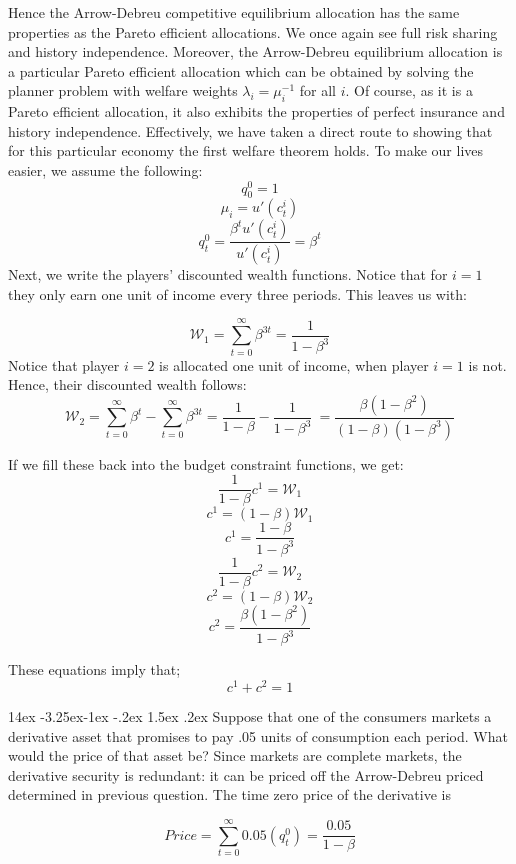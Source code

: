 \documentclass[10pt]{article}
\makeatletter
\newcommand{\bb}{\bigbreak\noindent}
\renewcommand\subsubsection{\leftskip 14ex\@startsection{subsubsection}{3}{\z@}%
	{-3.25ex\@plus -1ex \@minus -.2ex}%
	{1.5ex \@plus .2ex}%
	{\normalfont\large\bfseries}}
\makeatother
\begin{document}
\begin{spacing}{1.5}
		Hence the Arrow-Debreu competitive equilibrium allocation has the same properties as
		the Pareto efficient allocations. We once again see full risk sharing and history independence. Moreover, the Arrow-Debreu equilibrium allocation is a particular Pareto efficient allocation which can be obtained by solving the planner problem with welfare weights $\lambda_i = \mu^{-1}_i$ for all $i$. Of course, as it is a Pareto efficient allocation, it also exhibits the properties of perfect insurance and history independence. Effectively, we have taken a direct route to showing that for this particular economy the first welfare theorem holds.
		\bb
		To make our lives easier, we assume the following:
		\[ q^0_0 = 1 \]
		\[ \mu_i = u'(c^i_t) \]
		\[ q^0_t =  \dfrac{\beta^t u'(c^i_t)}{u'(c^i_t)} = \beta^t \]
		\bb
		Next, we write the players' discounted wealth functions. Notice that for $i = 1$ they only earn one unit of income every three periods. This leaves us with: 
		
		\[ \mathcal{W}_1 = \sum_{t=0}^{\infty} \beta^{3t} = \frac{1}{1-\beta^3}\]
		\bb
		Notice that player $i = 2$ is allocated one unit of income, when player $i = 1$ is not. Hence, their discounted wealth follows: 
		\[ \mathcal{W}_2 = \sum_{t=0}^{\infty} \beta^{t} - \sum_{t=0}^{\infty} \beta^{3t} = \frac{1}{1-\beta}-\frac{1}{1-\beta^3}\ = \dfrac{\beta (1-\beta^2)}{(1-\beta)(1-\beta^3)} \]
		
		\bb
		If we fill these back into the budget constraint functions, we get: 
		\[ \dfrac{1}{1-\beta}c^1 = \mathcal{W}_1 \]
		\[ c^1 = (1-\beta)\mathcal{W}_1 \]
		\[ c^1 = \dfrac{1-\beta}{1-\beta^3} \]
		\bb\bb
		\[ \dfrac{1}{1-\beta}c^2 = \mathcal{W}_2 \]
		\[ c^2 = (1-\beta)\mathcal{W}_2 \]
		\[ c^2 = \dfrac{\beta(1-\beta^2)}{1-\beta^3} \]
		
		These equations imply that;
		\[ c^1 + c^2 = 1 \] 
		
		\subsubsection{Suppose that one of the consumers markets a derivative asset that promises to pay .05 units of consumption each period. What would the price of that asset be?}
		Since markets are complete markets, the derivative security is redundant: it can be priced off the Arrow-Debreu priced determined in previous question. The time zero price of the derivative is 
		
		\[ Price = \sum_{t=0}^{\infty}0.05(q^0_t) = \frac{0.05}{1-\beta}\]
		


\end{spacing}
\end{document}
